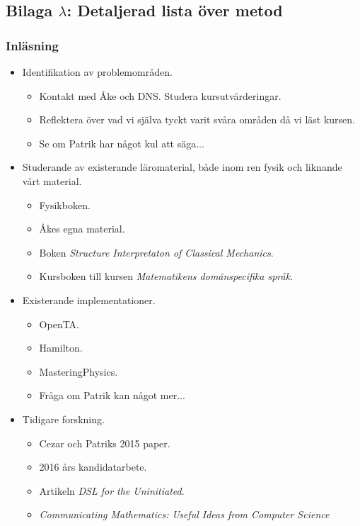 \documentclass[12pt,a4paper]{article}
\begin{document}
\subsection*{Bilaga $\lambda$: Detaljerad lista över metod}

\subsubsection*{Inläsning}

\begin{itemize}
    \item Identifikation av problemområden.
        \begin{itemize}
            \item Kontakt med Åke och DNS. Studera kursutvärderingar.
            \item Reflektera över vad vi själva tyckt varit svåra områden då vi läst kursen.
            \item Se om Patrik har något kul att säga...
        \end{itemize}
    \item Studerande av existerande läromaterial, både inom ren fysik och liknande vårt material.
        \begin{itemize}
            \item Fysikboken.
            \item Åkes egna material.
            \item Boken \textit{Structure Interpretaton of Classical Mechanics}\cite{SICM}.
            \item Kursboken till kursen \textit{Matematikens domänspecifika språk}.
        \end{itemize}
    \item Existerande implementationer.
        \begin{itemize}
            \item OpenTA.
            \item Hamilton.
            \item MasteringPhysics.
            \item Fråga om Patrik kan något mer...
        \end{itemize}
    \item Tidigare forskning.
        \begin{itemize}
            \item Cezar och Patriks 2015 paper.
            \item 2016 års kandidatarbete.
            \item Artikeln \textit{DSL for the Uninitiated}.
            \item \textit{Communicating Mathematics: Useful Ideas from Computer Science}
        \end{itemize}
\end{itemize}
\end{document}
